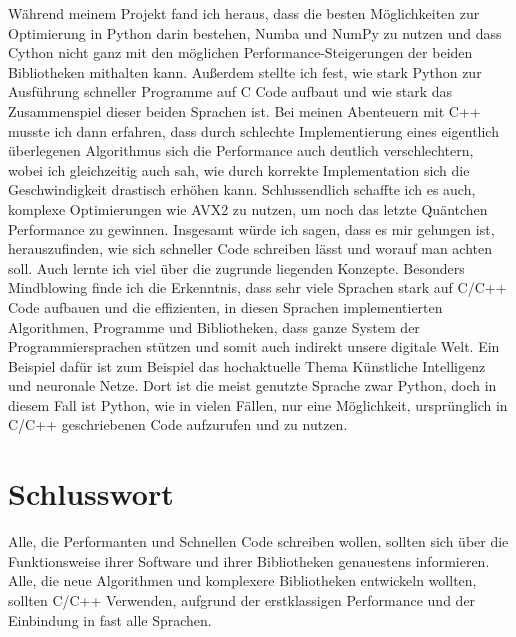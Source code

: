 \documentclass[10pt,a4paper]{article}
\begin{document}
Während meinem Projekt fand ich heraus, dass die besten Möglichkeiten zur Optimierung in Python darin bestehen,
Numba und NumPy zu nutzen und dass Cython nicht ganz mit den möglichen Performance-Steigerungen der beiden Bibliotheken mithalten kann.
Außerdem stellte ich fest, wie stark Python zur Ausführung schneller Programme auf C Code aufbaut und wie stark das Zusammenspiel dieser
beiden Sprachen ist.
Bei meinen Abenteuern mit C++ musste ich dann erfahren, dass durch schlechte Implementierung eines eigentlich überlegenen Algorithmus sich die
Performance auch deutlich verschlechtern, wobei ich gleichzeitig auch sah, wie durch korrekte Implementation sich die Geschwindigkeit drastisch
erhöhen kann. Schlussendlich schaffte ich es auch, komplexe Optimierungen wie AVX2 zu nutzen, um noch das letzte Quäntchen Performance zu gewinnen.
Insgesamt würde ich sagen, dass es mir gelungen ist, herauszufinden, wie sich schneller Code schreiben lässt und worauf man achten soll.
Auch lernte ich viel über die zugrunde liegenden Konzepte.
Besonders Mindblowing finde ich die Erkenntnis, dass sehr viele Sprachen stark auf C/C++ Code aufbauen
und die effizienten, in diesen Sprachen implementierten Algorithmen, Programme und Bibliotheken, dass ganze System
der Programmiersprachen stützen und somit auch indirekt unsere digitale Welt.
Ein Beispiel dafür ist zum Beispiel das hochaktuelle Thema Künstliche Intelligenz und neuronale Netze.
Dort ist die meist genutzte Sprache zwar Python, doch in diesem Fall ist Python, wie in vielen Fällen, nur
eine Möglichkeit, ursprünglich in C/C++ geschriebenen Code aufzurufen und zu nutzen.

\section{Schlusswort}

Alle, die Performanten und Schnellen Code schreiben wollen, sollten sich über die Funktionsweise ihrer 
Software und ihrer Bibliotheken genauestens informieren.
Alle, die neue Algorithmen und komplexere Bibliotheken entwickeln wollten, sollten C/C++
Verwenden, aufgrund der erstklassigen Performance und der Einbindung in fast alle Sprachen.

\clearpage

\printbibliography[title={Literaturverzeichnis}]
\end{document}
